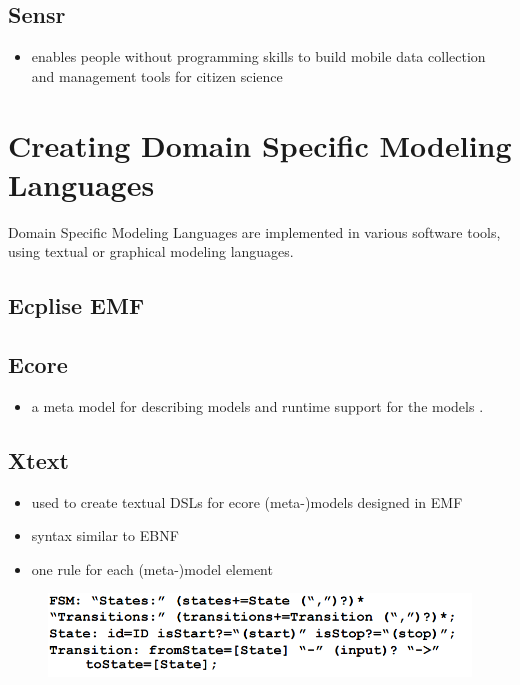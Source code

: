\documentclass[runningheads,a4paper]{llncs}
\begin{document}
    \subsection{Sensr}
    \begin{itemize}
     \item enables people without programming skills to build mobile data collection and management tools for citizen science
    \end{itemize}

    
    \section{Creating Domain Specific Modeling Languages}
    Domain Specific Modeling Languages are implemented in various software tools, using textual or graphical modeling languages.
    
    \subsection{Ecplise EMF}
     \subsection{Ecore}
      \begin{itemize}
	\item  a meta model  for describing models and runtime support for the models .
    \end{itemize}
    
    \subsection{Xtext}
    \begin{itemize}
      \item used to create textual DSLs for ecore (meta-)models designed in EMF
      \item syntax similar to EBNF
      \item one rule for each (meta-)model element
    \end{itemize}
    \begin{figure}[ht]
      \centering
      \includegraphics[width=\textwidth]{images/XTextGrammar.PNG}
    \end{figure}
    
\end{document}
